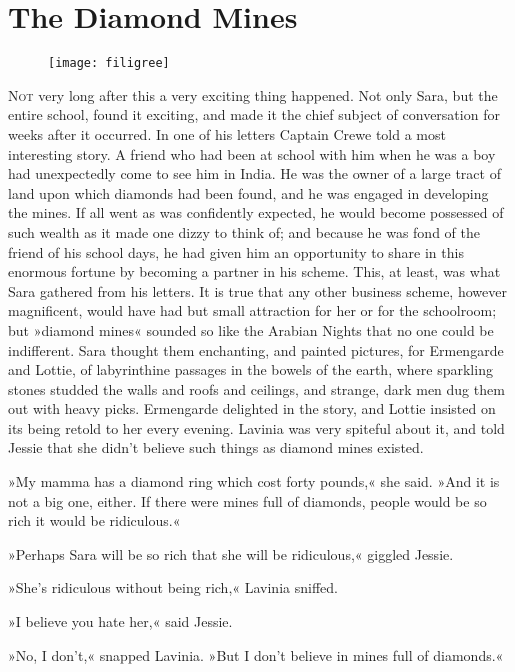 \chapter{The Diamond Mines}

\begin{figure}[t!]
\centering
\texttt{[image: filigree]}
\end{figure}

\lettrine[lines=5]{N}{ot} very long after this a very exciting thing happened. Not only Sara, but the entire school, found it exciting, and made it the chief subject of conversation for weeks after it occurred. In one of his letters Captain Crewe told a most interesting story. A friend who had been at school with him when he was a boy had unexpectedly come to see him in India. He was the owner of a large tract of land upon which diamonds had been found, and he was engaged in developing the mines. If all went as was confidently expected, he would become possessed of such wealth as it made one dizzy to think of; and because he was fond of the friend of his school days, he had given him an opportunity to share in this enormous fortune by becoming a partner in his scheme. This, at least, was what Sara gathered from his letters. It is true that any other business scheme, however magnificent, would have had but small attraction for her or for the schoolroom; but »diamond mines« sounded so like the Arabian Nights that no one could be indifferent. Sara thought them enchanting, and painted pictures, for Ermengarde and Lottie, of labyrinthine passages in the bowels of the earth, where sparkling stones studded the walls and roofs and ceilings, and strange, dark men dug them out with heavy picks. Ermengarde delighted in the story, and Lottie insisted on its being retold to her every evening. Lavinia was very spiteful about it, and told Jessie that she didn't believe such things as diamond mines existed.

»My mamma has a diamond ring which cost forty pounds,« she said. »And it is not a big one, either. If there were mines full of diamonds, people would be so rich it would be ridiculous.«

»Perhaps Sara will be so rich that she will be ridiculous,« giggled Jessie.

»She's ridiculous without being rich,« Lavinia sniffed.

»I believe you hate her,« said Jessie.

»No, I don't,« snapped Lavinia. »But I don't believe in mines full of diamonds.«


